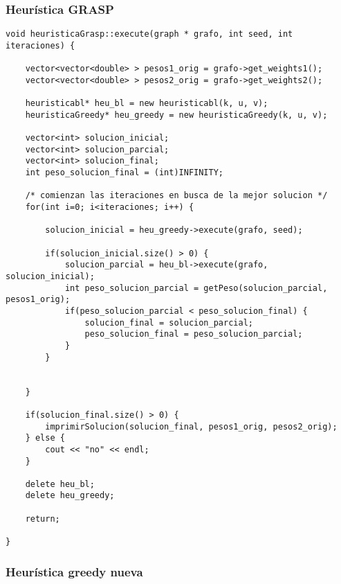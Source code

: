 \subsubsection{Heur\'istica GRASP}

\begin{lstlisting}
void heuristicaGrasp::execute(graph * grafo, int seed, int iteraciones) {
	
	vector<vector<double> > pesos1_orig = grafo->get_weights1();
	vector<vector<double> > pesos2_orig = grafo->get_weights2();
	
	heuristicabl* heu_bl = new heuristicabl(k, u, v);
	heuristicaGreedy* heu_greedy = new heuristicaGreedy(k, u, v);
	
	vector<int> solucion_inicial;
	vector<int> solucion_parcial;
	vector<int> solucion_final;
	int peso_solucion_final = (int)INFINITY;
	
	/* comienzan las iteraciones en busca de la mejor solucion */
	for(int i=0; i<iteraciones; i++) {
		
		solucion_inicial = heu_greedy->execute(grafo, seed);	
		
		if(solucion_inicial.size() > 0) {
			solucion_parcial = heu_bl->execute(grafo, solucion_inicial);
			int peso_solucion_parcial = getPeso(solucion_parcial, pesos1_orig);
			if(peso_solucion_parcial < peso_solucion_final) {
				solucion_final = solucion_parcial;
				peso_solucion_final = peso_solucion_parcial;
			}
		}
		
		
	}
	
	if(solucion_final.size() > 0) {
		imprimirSolucion(solucion_final, pesos1_orig, pesos2_orig);
	} else {
		cout << "no" << endl;
	}
	
	delete heu_bl;
	delete heu_greedy;
	
	return;
	
}

\end{lstlisting}


\subsubsection{Heur\'istica greedy nueva}

